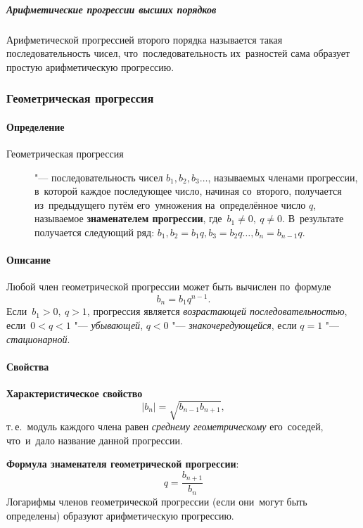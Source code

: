 \documentclass[]{scrartcl}
\begin{document}
{{\subparagraph{Арифметические прогрессии высших порядков}
Арифметической прогрессией второго порядка называется такая последовательность чисел, что~последовательность их~разностей сама образует простую арифметическую прогрессию.

\subsubsection{Геометрическая прогрессия}
\paragraph{Определение}
\begin{description}
	\item[Геометрическая прогрессия] "--- последовательность чисел ${\textstyle b_{1}, b_2, b_{3}\ldots}$, называемых членами прогрессии, в~которой каждое последующее число, начиная со~второго, получается из~предыдущего путём его~умножения на~определённое число ${\textstyle q}$, называемое \textbf{знаменателем прогрессии}, где~${\textstyle b_{1}\neq 0,\ q\neq 0}$. В~результате получается следующий ряд: ${\textstyle b_{1}, b_2 = b_{1}q, b_{3}=b_{2}q \ldots, b_n = b_{n−1}q}$. 
\end{description}
\paragraph{Описание}
Любой член геометрической прогрессии может быть вычислен по~формуле
\begin{equation}\label{eq:geometric-progression-01}
b_{n}=b_{1}q^{n-1}.
\end{equation}
Если~${\textstyle b_{1}>0,\ q>1}$, прогрессия является \emph{возрастающей последовательностью}, если~${\textstyle 0<q<1}$ "--- \emph{убывающей}, ${\textstyle q<0}$ "--- \emph{знакочередующейся}, если ${\textstyle q=1}$ "--- \emph{стационарной}. 
\paragraph{Свойства}
\textbf{Характеристическое свойство}\begin{equation}\label{eq:geometric-progression-02}
|b_{n}|={\sqrt{b_{n-1}b_{n+1}}},
\end{equation}
т.\,е.~модуль каждого члена равен \emph{среднему геометрическому} его~соседей, что~и~дало название данной прогрессии.

\textbf{Формула знаменателя геометрической прогрессии}:
\begin{equation}\label{eq:geometric-progression-03}
q={\frac{b_{n+1}}{b_{n}}} 
\end{equation}
Логарифмы членов геометрической прогрессии (если они~могут быть определены) образуют арифметическую прогрессию.

}}
\end{document}
